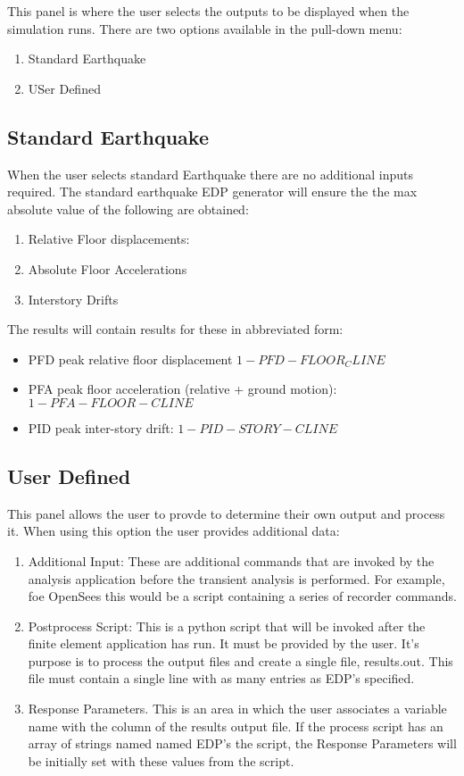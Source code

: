 This panel is where the user selects the outputs to be displayed when
the simulation runs. There are two options available in the pull-down
menu:
\begin{enumerate}
\item Standard Earthquake
\item USer Defined
\end{enumerate}

\subsection{Standard Earthquake}
When the user selects standard Earthquake there are no additional
inputs required. The standard earthquake EDP generator will ensure the
the max absolute value of the following are
obtained:
\begin{enumerate}
\item Relative Floor displacements:
\item Absolute Floor Accelerations
\item Interstory Drifts
\end{enumerate}

The results will contain results for these in abbreviated form:
\begin{itemize}
\item PFD peak relative floor displacement $1-PFD-FLOOR_CLINE$
\item PFA peak floor acceleration (relative + ground motion):
  $1-PFA-FLOOR-CLINE$
\item PID peak inter-story drift: $1-PID-STORY-CLINE$
\end{itemize}

\subsection{User Defined}
This panel allows the user to provde to determine their own output and
process it. When using this option the user provides additional data:
\begin{enumerate}
\item Additional Input: These are additional commands that are invoked
  by the analysis application before the transient analysis is
  performed. For example, foe OpenSees this would be a script
  containing a series of recorder commands.
\item Postprocess Script: This is a python script that will be invoked
  after the finite element application has run. It must be provided by
  the user. It's purpose is to process the output files and create a
  single file, results.out. This file must contain a single line with
  as many entries as EDP's specified.
\item Response Parameters. This is an area in which the user
  associates a variable name with the column of the results output
  file. If the process script has an array of strings named named
  EDP's the script, the Response Parameters will be initially set with
  these values from the script.
\end{enumerate}
